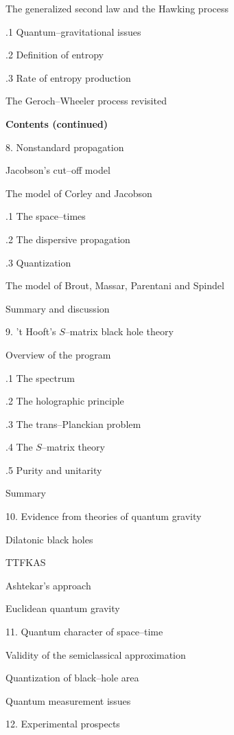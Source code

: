  The generalized second law and the Hawking process

\qquad{}.1 Quantum--gravitational issues

\qquad{}.2 Definition of entropy

\qquad{}.3 Rate of entropy production

 The Geroch--Wheeler process revisited

\vfill\eject

\noindent\bf Contents \rm (continued)

8. Nonstandard propagation

 Jacobson's cut--off model

 The model of Corley and Jacobson

\qquad{}.1 The space--times

\qquad{}.2 The dispersive propagation

\qquad{}.3 Quantization

 The model of Brout, Massar, Parentani and Spindel

 Summary and discussion

9.  't Hooft's $S$--matrix black hole theory

 Overview of the program

\qquad{}.1 The spectrum

\qquad{}.2 The holographic principle

\qquad{}.3 The trans--Planckian problem

\qquad{}.4 The $S$--matrix theory

\qquad{}.5 Purity and unitarity

 Summary

10. Evidence from theories of quantum gravity

 Dilatonic black holes

 TTFKAS

 Ashtekar's approach

 Euclidean quantum gravity

11. Quantum character of space--time

 Validity of the semiclassical approximation

 Quantization of black--hole area

 Quantum measurement issues

12. Experimental prospects

